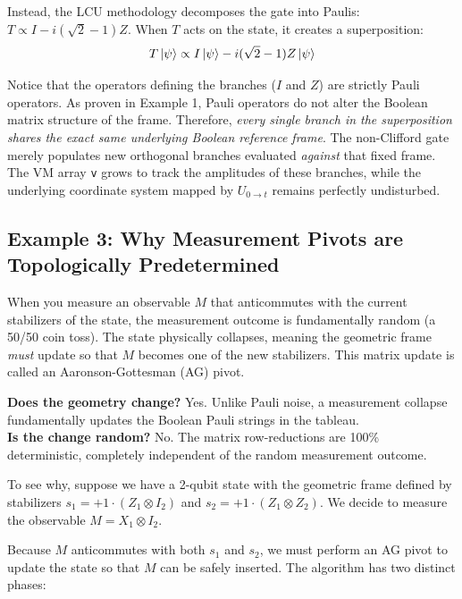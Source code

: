 \documentclass[11pt]{article}
\begin{document}
Instead, the LCU methodology decomposes the gate into Paulis: $T \propto I - i(\sqrt{2}-1) Z$. When $T$ acts on the state, it creates a superposition:
$$T\ket{\psi} \propto I\ket{\psi} - i(\sqrt{2}-1) Z\ket{\psi}$$

Notice that the operators defining the branches ($I$ and $Z$) are strictly Pauli operators. As proven in Example 1, Pauli operators do not alter the Boolean matrix structure of the frame. Therefore, \textit{every single branch in the superposition shares the exact same underlying Boolean reference frame}. The non-Clifford gate merely populates new orthogonal branches evaluated \textit{against} that fixed frame. The VM array \texttt{v} grows to track the amplitudes of these branches, while the underlying coordinate system mapped by $U_{0 \to t}$ remains perfectly undisturbed.

\subsection{Example 3: Why Measurement Pivots are Topologically Predetermined}

When you measure an observable $M$ that anticommutes with the current stabilizers of the state, the measurement outcome is fundamentally random (a 50/50 coin toss). The state physically collapses, meaning the geometric frame \textit{must} update so that $M$ becomes one of the new stabilizers. This matrix update is called an Aaronson-Gottesman (AG) pivot.

\textbf{Does the geometry change?} Yes. Unlike Pauli noise, a measurement collapse fundamentally updates the Boolean Pauli strings in the tableau. \\
\textbf{Is the change random?} No. The matrix row-reductions are 100\% deterministic, completely independent of the random measurement outcome.

To see why, suppose we have a 2-qubit state with the geometric frame defined by stabilizers $s_1 = +1 \cdot (Z_1 \otimes I_2)$ and $s_2 = +1 \cdot (Z_1 \otimes Z_2)$. We decide to measure the observable $M = X_1 \otimes I_2$.

Because $M$ anticommutes with both $s_1$ and $s_2$, we must perform an AG pivot to update the state so that $M$ can be safely inserted. The algorithm has two distinct phases:
\end{document}
